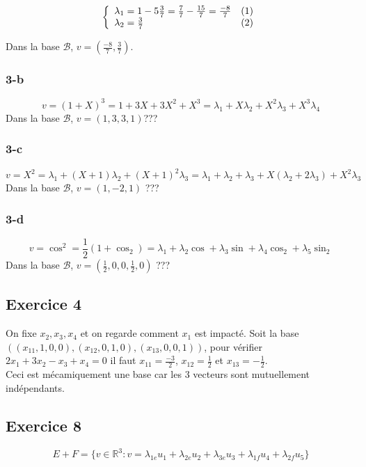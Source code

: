 \documentclass[]{book}
\theoremstyle{definition}
\newcommand{\bb}[1]{\mathbb{#1}}
\newcommand{\R}{\bb{R}}
\begin{document}
$$
\left\{ 
\begin{array}{l l}
\lambda_1 = 1 - 5\frac{3}{7} = \frac{7}{7}- \frac{15}{7} = \frac{-8}{7}& (1)\\
\lambda_2 = \frac{3}{7} & (2)\\
\end{array}
\right. 
$$ 

Dans la base $\mathcal{B}$, $v=(\frac{-8}{7},\frac{3}{7})$.

\subsubsection*{3-b}
$$v=(1+X)^3 = 1+3X+3X^2+X^3 = \lambda_1 + X\lambda_2 + X^2\lambda_3 + X^3\lambda_4$$
Dans la base $\mathcal{B}$, $v=(1,3,3,1)$???

\subsubsection*{3-c}
$$v=X^2 = \lambda_1 + (X+1)\lambda_2 + (X+1)^2\lambda_3 = \lambda_1+\lambda_2+\lambda_3 +X(\lambda_2+2\lambda_3) + X^2\lambda_3$$
Dans la base $\mathcal{B}$, $v=(1,-2,1)$ ???

\subsubsection*{3-d}
$$v=\cos^2 = \frac{1}{2}(1+\cos_2) = \lambda_1 + \lambda_2 \cos + \lambda_3 \sin + \lambda_4 \cos_2 + \lambda_5 \sin_2 $$
Dans la base $\mathcal{B}$, $v=(\frac{1}{2},0,0,\frac{1}{2},0)$ ???


\subsection*{Exercice 4}
On fixe $x_2, x_3,x_4$ et on regarde comment $x_1$ est impact\'e. Soit la base $( (x_{11},1,0,0), (x_{12},0,1,0), (x_{13},0,0,1))$, pour v\'erifier $2x_1+3x_2 -x_3+x_4 = 0$ il faut $x_{11}=\frac{-3}{2}$, $x_{12}=\frac{1}{2}$ et $x_{13}=-\frac{1}{2}$.\\
Ceci est m\'ecamiquement une base car les 3 vecteurs sont mutuellement ind\'ependants.



\subsection*{Exercice 8}
$$E + F = \{v \in \R^3: v = \lambda_{1e}u_1 + \lambda_{2e}u_2 + \lambda_{3e}u_3 + \lambda_{1f}u_4 + \lambda_{2f}u_5\}$$  
\end{document}
